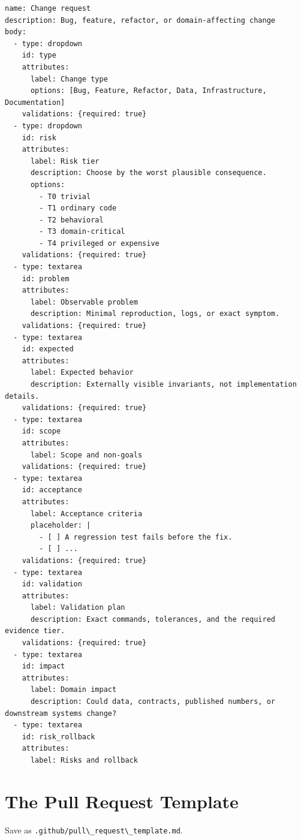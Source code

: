 \documentclass[11pt]{article}
\newcommand{\co}[1]{\lstinline[basicstyle=\ttfamily\color{gwInk}]{#1}}
\begin{document}
\begin{lstlisting}[style=gw]
name: Change request
description: Bug, feature, refactor, or domain-affecting change
body:
  - type: dropdown
    id: type
    attributes:
      label: Change type
      options: [Bug, Feature, Refactor, Data, Infrastructure, Documentation]
    validations: {required: true}
  - type: dropdown
    id: risk
    attributes:
      label: Risk tier
      description: Choose by the worst plausible consequence.
      options:
        - T0 trivial
        - T1 ordinary code
        - T2 behavioral
        - T3 domain-critical
        - T4 privileged or expensive
    validations: {required: true}
  - type: textarea
    id: problem
    attributes:
      label: Observable problem
      description: Minimal reproduction, logs, or exact symptom.
    validations: {required: true}
  - type: textarea
    id: expected
    attributes:
      label: Expected behavior
      description: Externally visible invariants, not implementation details.
    validations: {required: true}
  - type: textarea
    id: scope
    attributes:
      label: Scope and non-goals
    validations: {required: true}
  - type: textarea
    id: acceptance
    attributes:
      label: Acceptance criteria
      placeholder: |
        - [ ] A regression test fails before the fix.
        - [ ] ...
    validations: {required: true}
  - type: textarea
    id: validation
    attributes:
      label: Validation plan
      description: Exact commands, tolerances, and the required evidence tier.
    validations: {required: true}
  - type: textarea
    id: impact
    attributes:
      label: Domain impact
      description: Could data, contracts, published numbers, or downstream systems change?
  - type: textarea
    id: risk_rollback
    attributes:
      label: Risks and rollback
\end{lstlisting}

\section{The Pull Request Template}
\label{app:pr}

Save as \co{.github/pull\_request\_template.md}.
\end{document}
